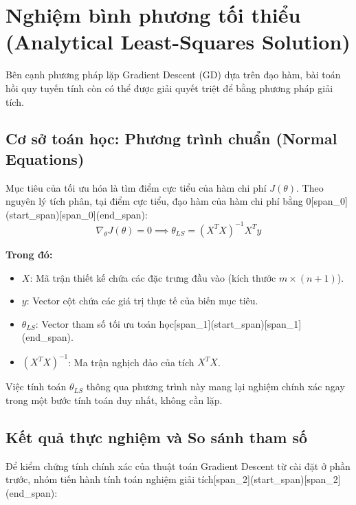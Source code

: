 \section{Nghiệm bình phương tối thiểu (Analytical Least-Squares Solution)}

Bên cạnh phương pháp lặp Gradient Descent (GD) dựa trên đạo hàm, bài toán hồi quy tuyến tính còn có thể được giải quyết triệt để bằng phương pháp giải tích.

\subsection{Cơ sở toán học: Phương trình chuẩn (Normal Equations)}
Mục tiêu của tối ưu hóa là tìm điểm cực tiểu của hàm chi phí $J(\theta)$. Theo nguyên lý tích phân, tại điểm cực tiểu, đạo hàm của hàm chi phí bằng 0[span_0](start_span)[span_0](end_span):
\begin{equation}
\nabla_{\theta} J(\theta) = 0 \implies \theta_{LS} = (X^T X)^{-1} X^T y
\end{equation}

\noindent\textbf{Trong đó:}
\begin{itemize}
    \item $X$: Mã trận thiết kế chứa các đặc trưng đầu vào (kích thước $m \times (n+1)$).
    \item $y$: Vector cột chứa các giá trị thực tế của biến mục tiêu.
    \item $\theta_{LS}$: Vector tham số tối ưu toán học[span_1](start_span)[span_1](end_span).
    \item $(X^T X)^{-1}$: Ma trận nghịch đảo của tích $X^T X$.
\end{itemize}
Việc tính toán $\theta_{LS}$ thông qua phương trình này mang lại nghiệm chính xác ngay trong một bước tính toán duy nhất, không cần lặp.

\subsection{Kết quả thực nghiệm và So sánh tham số}
Để kiểm chứng tính chính xác của thuật toán Gradient Descent từ cài đặt ở phần trước, nhóm tiến hành tính toán nghiệm giải tích[span_2](start_span)[span_2](end_span):

